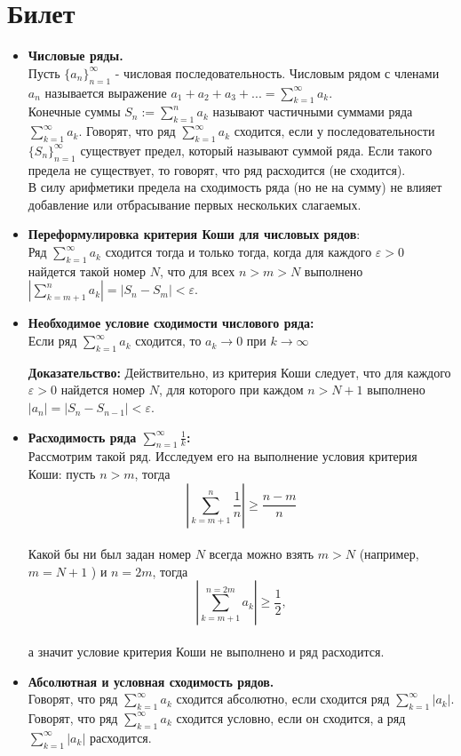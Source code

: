 \documentclass[12pt,a4paper]{article}
\begin{document}
\section{Билет}
\begin{itemize}
  \item \textbf{Числовые ряды.}\\
  Пусть $\{a_n\}_{n=1}^{\infty}$ - числовая последовательность. Числовым рядом с членами $a_n$ называется выражение $a_1 + a_2 + a_3 + ... =  \sum_{k = 1}^{\infty} a_k$.\\
  Конечные суммы $S_n := \sum_{k = 1}^n a_k$ называют частичными суммами ряда $\sum_{k = 1}^{\infty} a_k$. Говорят, что ряд $\sum_{k = 1}^{\infty} a_k$ сходится, если у последовательности $\{S_n\}_{n = 1}^{\infty}$ существует предел, который называют суммой ряда. Если такого предела не существует, то говорят, что ряд расходится (не сходится).\\
  В силу арифметики предела на сходимость ряда (но не на сумму) не влияет добавление или отбрасывание первых нескольких слагаемых.

  \item \textbf{Переформулировка критерия Коши для числовых рядов}:\\
  Ряд $\sum_{k = 1}^{\infty} a_k$ сходится тогда и только тогда, когда для каждого $\varepsilon > 0$ найдется такой номер $N$, что для всех $n > m > N$ выполнено $|\sum_{k = m + 1}^n a_k| = |S_n - S_m| < \varepsilon$.
  
  \item \textbf{Необходимое условие сходимости числового ряда:}\\
  Если ряд $\sum_{k = 1}^{\infty} a_k$  сходится, то $a_k \to 0$ при $k \to \infty$
  
  \textbf{Доказательство:} Действительно, из критерия Коши следует, что для каждого $\varepsilon > 0$ найдется номер $N$, для которого при каждом $n > N + 1$ выполнено $|a_n| = |S_n - S_{n - 1}| < \varepsilon$.
  
  \item \textbf{Расходимость ряда $\sum_{n = 1}^{\infty}{\frac{1}{k}}$:}\\
  Рассмотрим такой ряд. Исследуем его на выполнение условия критерия Коши: пусть $n > m$, тогда 
\[
  |\sum_{k = m + 1}^n \frac{1}{n}| \geq \frac{n - m}{n}
\]\\
  Какой бы ни был задан номер $N$ всегда можно взять $m > N$ (например, $m = N + 1$ ) и $n = 2m$, тогда 
\[
  |\sum_{k = m + 1}^{n = 2m} a_k| \geq \frac{1}{2},
\]\\
а значит условие критерия Коши не выполнено и ряд расходится.
  
\item \textbf{Абсолютная и условная сходимость рядов.} \\
Говорят, что ряд $\sum_{k = 1}^{\infty} a_k$ сходится абсолютно, если сходится ряд $\sum_{k = 1}^{\infty} |a_k|$.\\
Говорят, что ряд $\sum_{k = 1}^{\infty} a_k$ сходится условно, если он сходится, а ряд $\sum_{k = 1}^{\infty} |a_k|$ расходится.
\end{itemize}
\end{document}

